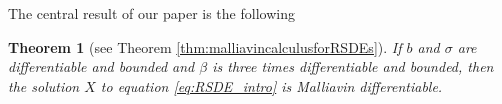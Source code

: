 \documentclass[11pt,a4paper]{article}
\newcommand{\rd}{\mathrm{d}}
\theoremstyle{plain}
\newtheorem*{thm*}{Theorem}
\begin{document}





The central result of our paper is the following

\begin{thm*}[see Theorem \ref{thm:malliavincalculusforRSDEs}]
If $b$ and $\sigma$ are differentiable and bounded and $\beta$ is three times differentiable and bounded, then the solution $X$ to equation \eqref{eq:RSDE_intro} is Malliavin differentiable.
\end{thm*}
\end{document}
